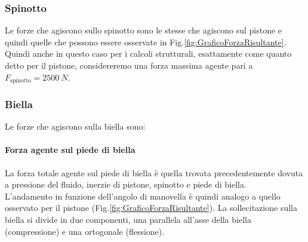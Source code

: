 \subsubsection{Spinotto}
Le forze che agiscono sullo spinotto sono le stesse che agiscono sul pistone e quindi quelle che possono essere osservate in Fig.\ref{fig:GraficoForzaRisultante}.\\
Quindi anche in questo caso per i calcoli strutturali, esattamente come quanto detto per il pistone, considereremo una forza massima agente pari a $F_{\mbox{spinotto}} = 2500\ N$. 
\subsubsection{Biella}
Le forze che agiscono sulla biella sono:
\paragraph{Forza agente sul piede di biella}La forza totale agente sul piede di biella è quella trovata precedentemente dovuta a pressione del fluido, inerzie di pistone, spinotto e piede di biella. \\
L’andamento in funzione dell’angolo di manovella è quindi analogo a quello osservato per il pistone (Fig.\ref{fig:GraficoForzaRisultante}).  La sollecitazione sulla biella si divide in due componenti, una parallela all’asse della biella (compressione) e una ortogonale (flessione). 
